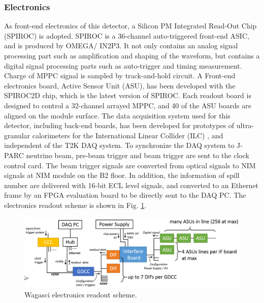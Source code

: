 \subsubsection{Electronics}
As front-end electronics of this detector, a Silicon PM Integrated Read-Out Chip (SPIROC) \cite{spiroc} is adopted.
SPIROC is a 36-channel auto-triggered front-end ASIC, and is produced by OMEGA/ IN2P3. 
It not only contains an analog signal processing part such as amplification and shaping of the waveform, but contains a digital signal processing parts such as auto-trigger and timing measurement.
Charge of MPPC signal is sampled by track-and-hold circuit.
A Front-end electronics board, Active Sensor Unit (ASU), has been developed with the SPIROC2D chip, which is the latest version of SPIROC. 
Each readout board is designed to control a 32-channel arrayed MPPC, and 40 of the ASU boards are aligned on the module surface. 
The data acquisition system used for this detector, including back-end boards, has been developed for prototypes of ultra-granular calorimeters for the International Linear Collider (ILC) \cite{cal_ilc}, and independent of the T2K DAQ system.
To synchronize the DAQ system to J- PARC neutrino beam, pre-beam trigger and beam trigger are sent to the clock control card.
The beam trigger signals are converted from optical signals to NIM signals at NIM module on the B2 floor.
In addition, the information of spill number are delivered with 16-bit ECL level signals, and converted to an Ethernet frame by an FPGA evaluation board to be directly sent to the DAQ PC.
The electronics readout scheme is shown in Fig. \ref{fig:wagasci_elec_scheme}.

\begin{figure}[tbh]
\begin{center}
\includegraphics[width=1.0\linewidth]{fig/wagasci_elec_scheme.pdf}
\end{center}
\caption{
Wagasci electronics readout scheme.
}
\label{fig:wagasci_elec_scheme}
\end{figure}


